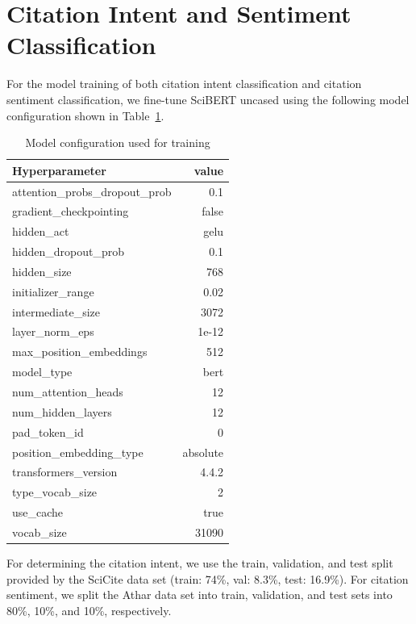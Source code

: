 \section{Citation Intent and Sentiment Classification}\label{app:classifcation}

For the model training of both citation intent classification and citation sentiment classification, we fine-tune SciBERT uncased using the following model configuration shown in Table~\ref{tab:modelconf}.

\begin{table}
\caption{Model configuration used for training}
 \label{tab:modelconf}
  \centering
  \begin{small}
 \begin{threeparttable}
 \begin{tabular}{lr}
 \toprule
   Hyperparameter & value \\
   \midrule
  attention\_probs\_dropout\_prob &  0.1 \\
  gradient\_checkpointing &  false \\
  hidden\_act &  gelu \\
  hidden\_dropout\_prob &  0.1 \\
  hidden\_size &  768 \\
  initializer\_range &  0.02 \\
  intermediate\_size &  3072 \\
  layer\_norm\_eps &  1e-12 \\
  max\_position\_embeddings &  512 \\
  model\_type &  bert \\
  num\_attention\_heads &  12 \\
  num\_hidden\_layers &  12 \\
  pad\_token\_id &  0 \\
  position\_embedding\_type &  absolute \\
  transformers\_version &  4.4.2 \\
  type\_vocab\_size &  2 \\
  use\_cache &  true \\
  vocab\_size &  31090 \\
   \bottomrule
 \end{tabular}
\end{threeparttable}
  \end{small}
\end{table}

For determining the citation intent, we use the train, validation, and test split provided by the SciCite data set (train: 74\%, val: 8.3\%, test: 16.9\%). For citation sentiment, we split the Athar data set into train, validation, and test sets into 80\%, 10\%, and 10\%, respectively.



